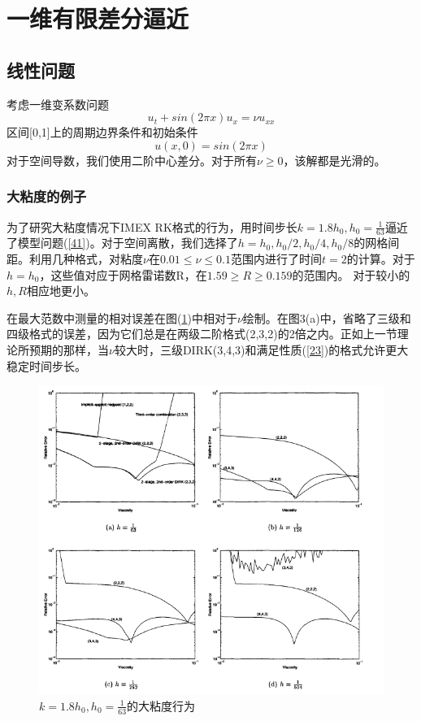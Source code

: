 \documentclass[12pt,a4paper]{article}
\numberwithin{equation}{section}
\begin{document}
\section{一维有限差分逼近}
\subsection{线性问题}

考虑一维变系数问题
\begin{equation}
u_{t}+sin(2\pi x)u_{x}=\nu u_{xx}
\label{41}
\end{equation}
区间[0,1]上的周期边界条件和初始条件
\begin{equation*}
u(x,0)=sin(2\pi x)
\end{equation*}
对于空间导数，我们使用二阶中心差分。对于所有$\nu\ge 0$，该解都是光滑的。

\subsubsection{大粘度的例子}

为了研究大粘度情况下IMEX RK格式的行为，用时间步长$k=1.8h_{0},h_{0}=\frac{1}{63}$逼近了模型问题(\ref{41})。对于空间离散，我们选择了$h=h_{0},h_{0}/2,h_{0}/4,h_{0}/8$的网格间距。利用几种格式，对粘度$\nu$在$0.01\le \nu\le 0.1$范围内进行了时间$t=2$的计算。对于$h=h_{0}$，这些值对应于网格雷诺数R，在$1.59\ge R\ge 0.159$的范围内。 对于较小的$h,R$相应地更小。

在最大范数中测量的相对误差在图(\ref{figures3})中相对于$\nu$绘制。在图3(a)中，省略了三级和四级格式的误差，因为它们总是在两级二阶格式(2,3,2)的2倍之内。正如上一节理论所预期的那样，当$\nu$较大时，三级DIRK(3,4,3)和满足性质(\ref{23})的格式允许更大稳定时间步长。
\begin{figure}[H]
\includegraphics[width=15cm]{./figures/3.png}
\caption{$k=1.8h_{0},h_{0}=\frac{1}{63}$的大粘度行为}
\centering
\label{figures3}
\end{figure}
\end{document}
